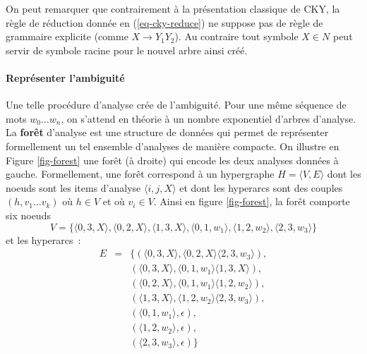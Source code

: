 \documentclass[11pt,openany]{book}
\begin{document}
On peut remarquer que contrairement à la présentation classique de CKY, la règle de réduction donnée en (\ref{eq-cky-reduce})
ne suppose pas de règle de grammaire explicite (comme $X\rightarrow Y_1 Y_2$). 
Au contraire tout symbole $X\in N$ peut servir de symbole  racine pour le nouvel arbre ainsi créé.
 
\paragraph{Représenter l'ambiguité}
Une telle procédure d'analyse crée de l'ambiguité. 
Pour une même séquence de mots $w_0\ldots w_n$, on s'attend en théorie à  un nombre 
exponentiel d'arbres d'analyse.
La {\bf forêt} d'analyse est une structure de données qui permet de représenter formellement un tel ensemble d'analyses de manière compacte.
On illustre en Figure \ref{fig-forest} une forêt (à droite) qui encode les deux analyses données à gauche.
Formellement, 
une forêt correspond à un hypergraphe $H=\langle V,E \rangle$ dont les noeuds sont les items d'analyse $\langle i,j,X\rangle$ et dont les hyperarcs
sont des couples $(h,v_1\ldots v_k)$ où $h\in V$ et où $v_i \in V$.
Ainsi en figure \ref{fig-forest}, la forêt comporte six noeuds 
\begin{displaymath}
V = \{ \langle 0,3,X \rangle, \langle 0,2,X \rangle, \langle 1,3,X \rangle , \langle 0,1,w_1 \rangle,
 \langle 1,2,w_2 \rangle, \langle 2,3,w_3 \rangle \}
\end{displaymath}
et les hyperarcs~: 
\begin{eqnarray*}
E &= &\{( \langle 0,3,X \rangle, \langle 0,2,X \rangle  \langle 2,3,w_3 \rangle ),\\
&&( \langle 0,3,X \rangle, \langle 0,1,w_1 \rangle  \langle 1,3,X \rangle ),\\
&&( \langle 0,2,X \rangle, \langle 0,1,w_1 \rangle  \langle 1,2,w_2 \rangle ),\\
&&( \langle 1,3,X \rangle, \langle 1,2,w_2 \rangle  \langle 2,3,w_3 \rangle ),\\
&&( \langle 0,1,w_1 \rangle, \epsilon ),\\
&&( \langle 1,2,w_2 \rangle, \epsilon ),\\
&&( \langle 2,3,w_3 \rangle, \epsilon )\}
\end{eqnarray*}
\end{document}

